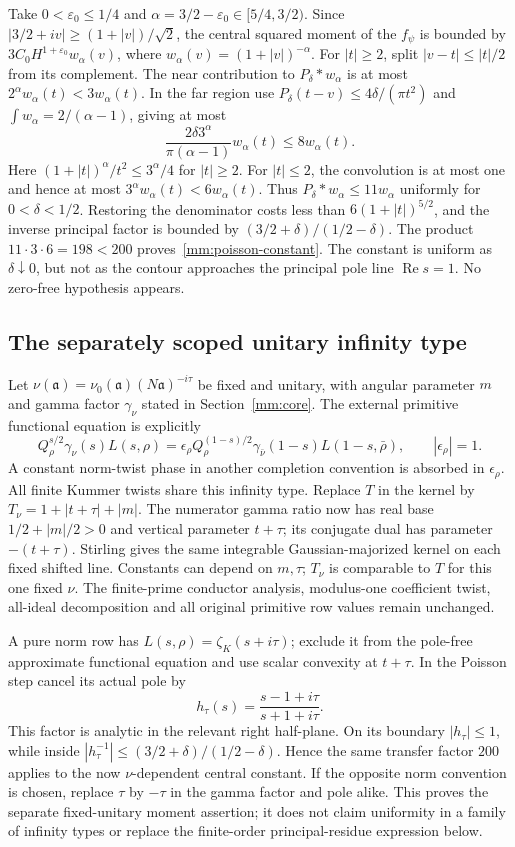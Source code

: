 \documentclass[11pt]{article}
\theoremstyle{definition}\newtheorem{definition}[theorem]{Definition}
\theoremstyle{remark}\newtheorem{remark}[theorem]{Remark}
\begin{document}
Take $0<\varepsilon_0\le1/4$ and
$\alpha=3/2-\varepsilon_0\in[5/4,3/2)$. Since
$|3/2+iv|\ge(1+|v|)/\sqrt2$, the central squared moment of the
$f_\psi$ is bounded by
$3C_0H^{1+\varepsilon_0}w_\alpha(v)$, where
$w_\alpha(v)=(1+|v|)^{-\alpha}$.
For $|t|\ge2$, split $|v-t|\le|t|/2$ from its complement. The
near contribution to $P_\delta*w_\alpha$ is at most
$2^\alpha w_\alpha(t)<3w_\alpha(t)$. In the far region use
$P_\delta(t-v)\le4\delta/(\pi t^2)$ and
$\int w_\alpha=2/(\alpha-1)$, giving at most
\[
 \frac{2\delta3^\alpha}{\pi(\alpha-1)}w_\alpha(t)
 \le8w_\alpha(t).
\]
Here $(1+|t|)^\alpha/t^2\le3^\alpha/4$ for $|t|\ge2$.
For $|t|\le2$, the convolution is at most one and hence at most
$3^\alpha w_\alpha(t)<6w_\alpha(t)$. Thus
$P_\delta*w_\alpha\le11w_\alpha$ uniformly for $0<\delta<1/2$.
Restoring the denominator costs less than
$6(1+|t|)^{5/2}$, and the inverse principal factor is bounded by
$(3/2+\delta)/(1/2-\delta)$. The product $11\cdot3\cdot6=198<200$
proves~\eqref{mm:poisson-constant}. The constant is uniform as
$\delta\downarrow0$, but not as the contour approaches the principal
pole line $\operatorname{Re}s=1$. No zero-free hypothesis appears.

\subsection{The separately scoped unitary infinity type}
Let $\nu(\mathfrak a)=\nu_0(\mathfrak a)(N\mathfrak a)^{-i\tau}$
be fixed and unitary, with angular parameter $m$ and gamma factor
$\gamma_\nu$ stated in Section~\ref{mm:core}. The external primitive
functional equation is explicitly
\[
 Q_\rho^{s/2}\gamma_\nu(s)L(s,\rho)
 =\epsilon_\rho Q_\rho^{(1-s)/2}
                 \gamma_{\bar\nu}(1-s)L(1-s,\bar\rho),
 \qquad |\epsilon_\rho|=1.
\]
A constant norm-twist phase in another completion convention is absorbed
in $\epsilon_\rho$. All finite Kummer twists share this infinity type.
Replace $T$ in the kernel by $T_\nu=1+|t+\tau|+|m|$.
The numerator gamma ratio now has real base $1/2+|m|/2>0$ and
vertical parameter $t+\tau$; its conjugate dual has parameter
$-(t+\tau)$. Stirling gives the same integrable Gaussian-majorized
kernel on each fixed shifted line. Constants can depend on $m,\tau$;
$T_\nu$ is comparable to $T$ for this one fixed $\nu$.
The finite-prime conductor analysis, modulus-one coefficient twist,
all-ideal decomposition and all original primitive row values remain
unchanged.

A pure norm row has $L(s,\rho)=\zeta_K(s+i\tau)$; exclude it from
the pole-free approximate functional equation and use scalar convexity
at $t+\tau$. In the Poisson step cancel its actual pole by
\[
 h_\tau(s)=\frac{s-1+i\tau}{s+1+i\tau}.
\]
This factor is analytic in the relevant right half-plane. On its
boundary $|h_\tau|\le1$, while inside
$|h_\tau^{-1}|\le(3/2+\delta)/(1/2-\delta)$.
Hence the same transfer factor $200$ applies to the now
$\nu$-dependent central constant. If the opposite norm convention is
chosen, replace $\tau$ by $-\tau$ in the gamma factor and pole alike.
This proves the separate fixed-unitary moment assertion; it does not
claim uniformity in a family of infinity types or replace the
finite-order principal-residue expression below.
\end{document}
